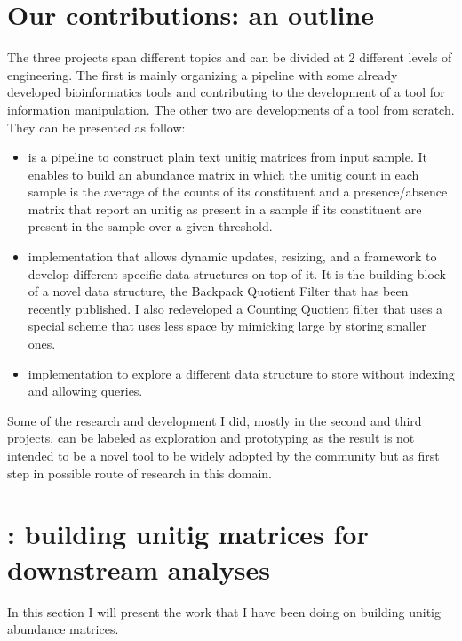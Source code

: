 \section{Our contributions: an outline}
The three projects span different topics and can be divided at 2 different levels of engineering. The first is mainly organizing a pipeline with some already developed bioinformatics tools and contributing to the development of a tool for \kmer information manipulation. The other two are developments of a tool from scratch.\\
They can be presented as follow:
\begin{itemize}
	\item[\textbf{\muset}] is a pipeline to construct plain text unitig matrices from input sample. It enables to build an abundance matrix in which the unitig count in each sample is the average of the counts of its constituent \kmers and a presence/absence matrix that report an unitig as present in a sample if its constituent \kmers are present in the sample over a given threshold.\\
	\item[\smash{\stackunder{A \textbf{Quotient}}{\textbf{filter}}}] implementation that allows dynamic updates, resizing, and a framework to develop different specific data structures on top of it. It is the building block of a novel data structure, the Backpack Quotient Filter that has been recently published. I also redeveloped a Counting Quotient filter that uses a special scheme that uses less space by mimicking large \kmers by storing smaller ones.\\ 
	\item[\smash{\stackunder{A \textbf{\skmer}}{\textbf{sorting}}}] implementation to explore a different data structure to store \kmers without indexing and allowing queries.
\end{itemize}
Some of the research and development I did, mostly in the second and third projects, can be labeled as exploration and prototyping as the result is not intended to be a novel tool to be widely adopted by the community but as first step in possible route of research in this domain.

\section{\muset: building unitig matrices for downstream analyses}
In this section I will present the work that I have been doing on building unitig abundance matrices.

